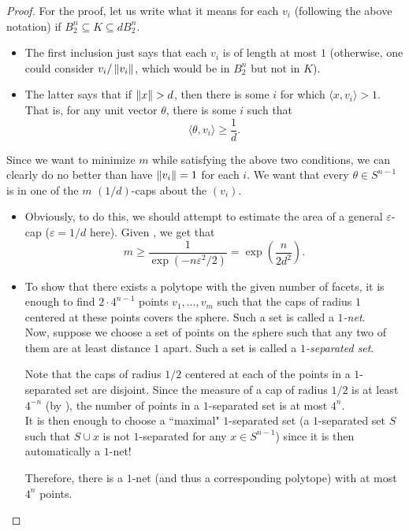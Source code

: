 \begin{proof}
For the proof, let us write what it means for each $v_i$ (following the above notation) if $B_2^n\subseteq K\subseteq dB_2^n$.
\begin{itemize}
    \item The first inclusion just says that each $v_i$ is of length at most $1$ (otherwise, one could consider $v_i/\left\lVert v_i\right\rVert$, which would be in $B_2^n$ but not in $K$).
    \item The latter says that if $\left\lVert x\right\rVert>d$, then there is some $i$ for which $\langle x,v_i\rangle > 1$. That is, for any unit vector $\theta$, there is some $i$ such that
\[ \langle \theta, v_i\rangle \geq \frac{1}{d}. \]
\end{itemize} 
Since we want to minimize $m$ while satisfying the above two conditions, we can clearly do no better than have $\left\lVert v_i\right\rVert=1$ for each $i$. We want that every $\theta\in S^{n-1}$ is in one of the $m$ $(1/d)$-caps about the $(v_i)$.
\begin{itemize}
    \item Obviously, to do this, we should attempt to estimate the area of a general $\varepsilon$-cap ($\varepsilon=1/d$ here). Given , we get that
    \[ m \geq \frac{1}{\exp(-n\varepsilon^2/2)} = \exp\left(\frac{n}{2d^2}\right). \]

    \item To show that there exists a polytope with the given number of facets, it is enough to find $2\cdot4^{n-1}$ points $v_1,\ldots,v_m$ such that the caps of radius $1$ centered at these points covers the sphere. Such a set is called a \textit{$1$-net}.\\
    Now, suppose we choose a set of points on the sphere such that any two of them are at least distance $1$ apart. Such a set is called a \textit{$1$-separated set}.
    
    Note that the caps of radius $1/2$ centered at each of the points in a $1$-separated set are disjoint. Since the measure of a cap of radius $1/2$ is at least $4^{-n}$ (by ), the number of points in a $1$-separated set is at most $4^{n}$.\\
    It is then enough to choose a ``maximal" $1$-separated set (a $1$-separated set $S$ such that $S\cup x$ is not $1$-separated for any $x\in S^{n-1}$) since it is then automatically a $1$-net!
    
    Therefore, there is a $1$-net (and thus a corresponding polytope) with at most $4^{n}$ points.
\end{itemize}
\end{proof}


